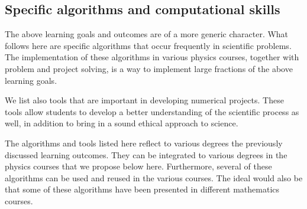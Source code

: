 \documentclass[%
oneside,                 %
final,                   %
10pt]{article}
\begin{document}
\noindent
\subsection*{Specific algorithms and computational skills}

The above learning goals and outcomes are of a more generic character. What follows here are specific 
algorithms that occur frequently in scientific problems. The implementation of these algorithms in various physics courses, together with problem and project solving, is a way to implement large fractions of the above learning goals. 

We list also tools that are important in developing
numerical projects. These tools allow students to develop a better understanding of the scientific process as well, in addition to bring in a sound ethical approach to science.

The algorithms and tools listed here reflect to various degrees the previously discussed learning outcomes. They can be integrated to various degrees in the physics courses that we propose below here. Furthermore, several of these algorithms can be used and reused in the various courses. The ideal would also be that some of these algorithms have been presented in different mathematics courses.
\end{document}

